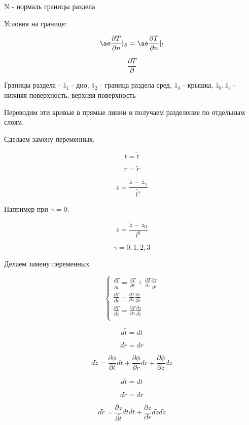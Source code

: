 \documentclass[12pt, a4paper]{article}
\begin{document}
N - нормаль границы раздела

Условия на границе:

\[ \ae \frac{\partial T}{\partial n}|_S = \ae \frac{\partial T}{\partial n}|_l \]

\[\frac{\partial T}{\partial }  \]

Границы раздела - $ \widetilde{z_1} $ - дно, $ \widetilde{z_2} $ - граница раздела сред, $ \widetilde{z_3} $ - крышка, $ \widetilde{z_0}, \widetilde{z_4} $ - нижняя поверхность, верхняя поверхность

Переводим эти кривые в прямые линии и получаем разделение по отдельным слоям.

Сделаем замену переменных:

\[ t = \widetilde{t} \]

\[ r = \widetilde{r} \]

\[ z = \frac{\widetilde{z} - \widetilde{z_{\gamma}}}{\widetilde{l^{\gamma}}} \]

Например при $ \gamma = 0 $:

\[ z = \frac{\widetilde{z} - z_0}{l^0} \]

\[ \gamma = 0, 1, 2, 3 \]

Делаем замену переменных

$$
\left\{ \begin{array}{c}

\frac{\partial T}{\partial \widetilde{t}} = \frac{\partial T}{\partial t} + \frac{\partial T}{\partial z} \frac{\partial z}{\partial \widetilde{t}} \\

\frac{\partial T}{\partial \widetilde{r}} + \frac{\partial T}{\partial z}\frac{\partial z}{\partial \widetilde{r}} \\

\frac{\partial T}{\partial \widetilde{z}} = \frac{\partial T}{\partial z} \frac{\partial z}{\partial \widetilde{z}} \\

\end{array} \right.
$$

\[ d \widetilde{t} = dt \]

\[ d \widetilde{r} = dr \]

\[ d \widetilde{z} = \frac{\partial \phi}{\partial t} dt + \frac{\partial \phi}{\partial r} dr + \frac{\partial \phi}{\partial z} d z\]

\[ d \widetilde{t} = dt \]

\[ d \widetilde{r} = dr \]

\[ d \widetilde{r} = \frac{\partial z}{\partial \widetilde{t}} d \widetilde{t} d \widetilde{t} + \frac{\partial z}{\partial \widetilde{r}}d \widetilde{z} d \widetilde{z} \]
\end{document}
